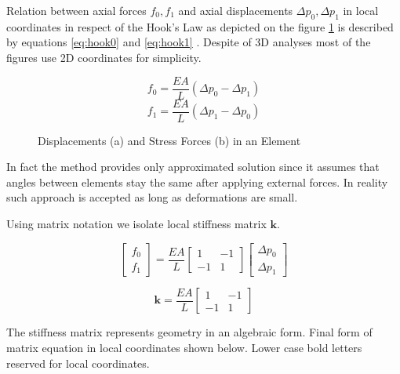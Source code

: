 Relation between axial forces $f_0, f_1$ and axial displacements $\Delta p_0, \Delta p_1$ in local coordinates in respect of the Hook's Law as depicted on the figure \ref{fig:displacement:and:force} is described by equations \ref{eq:hook0} and \ref{eq:hook1} . Despite of 3D analyses most of the figures use 2D coordinates for simplicity.

\begin{equation}
f_0 = \frac {EA} L (\Delta p_0 - \Delta p_1)
\label{eq:hook0}
\end{equation}
\begin{equation}
f_1 = \frac {EA} L (\Delta p_1 - \Delta p_0)
\label{eq:hook1}
\end{equation}

\begin{figure}[H]
\centering

\caption{Displacements (a) and Stress Forces (b) in an Element}
\label{fig:displacement:and:force}
\end{figure}

In fact the method provides only approximated solution since it assumes that angles between elements stay the same after applying external forces. In reality such approach is accepted   as long as deformations are small.

\bigskip

Using matrix notation we isolate local stiffness matrix $\mathbf{k}$.

\begin{equation}
\begin{bmatrix}
	f_0 \\
	f_1
\end{bmatrix}
= \frac {EA} L
\begin{bmatrix}
	1 & -1 \\
	-1 & 1
\end{bmatrix}
\begin{bmatrix}
	\Delta p_0 \\
	\Delta p_1
\end{bmatrix}
\end{equation}

\begin{equation}
\mathbf k = \frac {EA} L
\begin{bmatrix}
	1 & -1 \\
	-1 & 1
\end{bmatrix}
\end{equation}

The stiffness matrix represents geometry in an algebraic form. Final form of matrix equation in local coordinates shown below. Lower case bold letters reserved for local coordinates.

